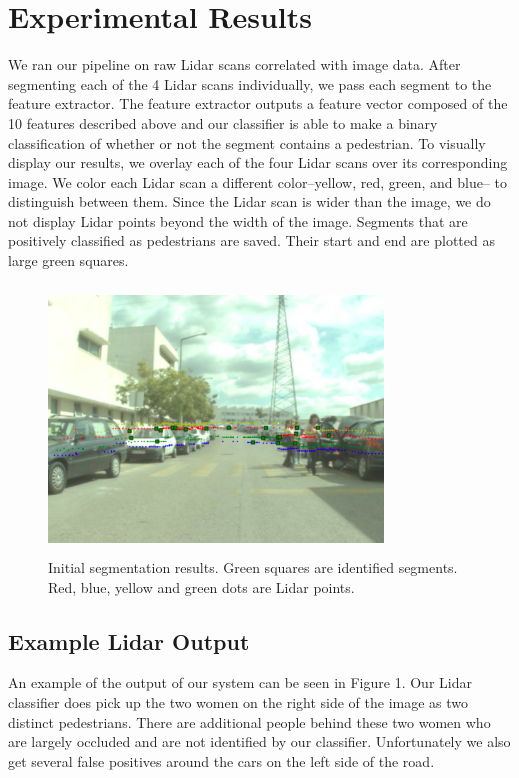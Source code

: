 \documentclass[10pt,twocolumn,letterpaper]{article}
\begin{document}
\section{Experimental Results}
  We ran our pipeline on raw Lidar scans correlated with image data. After
  segmenting each of the 4 Lidar scans individually, we pass each segment to the
  feature extractor. The feature extractor outputs a feature vector composed of
  the 10 features described above and our classifier is able to make a binary
  classification of whether or not the segment contains a pedestrian. To visually
  display our results, we overlay each of the four Lidar scans over its corresponding
  image. We color each Lidar scan a different color--yellow, red, green, and blue--
  to distinguish between them. Since the Lidar scan is wider than the image,
  we do not display Lidar points beyond the width of the image. Segments that are
  positively classified as pedestrians are saved. Their start and end are plotted
  as large green squares.

  \begin{figure}
    \includegraphics[height=2.8in, width=3.5in]{images/initial_result.png}
    \caption{ Initial segmentation results. Green squares are identified
    segments. Red, blue, yellow and green dots are Lidar points.}
  \end{figure}

  \subsection{Example Lidar Output}
  An example of the output of our system can be seen in Figure 1. Our Lidar
  classifier does pick up the two women on the right side of the image as two
  distinct pedestrians. There are additional people behind these two women
  who are largely occluded and are not identified by our classifier. Unfortunately
  we also get several false positives around the cars on the left side of the road.
\end{document}
